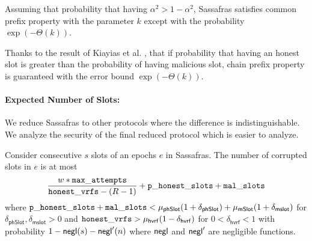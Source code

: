 \begin{lemma}[CP]
	Assuming that probability that having  $ \alpha^2 > 1- \alpha^2 $, Sassafras satisfies common prefix property  with the parameter $ k $ except with the probability  $ \exp(-\Theta(k)) $. 
\end{lemma}


Thanks to the result of  Kiayias et al. \cite{consistency}, that if probability that having an honest slot is greater than the probability of having malicious slot, chain prefix property is guaranteed with the error bound $ \exp(-\Theta(k)) $.




%
%
%
%
%
%
%
%


\paragraph{Expected Number of Slots:}


We reduce Sassafras to other protocols where the difference is indistinguishable. We analyze the security of the final reduced protocol which is easier to analyze.

\begin{theorem}
	Consider consecutive $ s $ slots of an epochs $ e $  in Sassafras. The number of corrupted slots in $ e $ is at most
	$$ \frac{w *\mathtt{max\_attempts}}{\mathtt{honest\_vrfs} - (R-1)} +  \mathtt{p\_honest\_slots} + \mathtt{mal\_slots} $$ 
	 where $ \mathtt{p\_honest\_slots} + \mathtt{mal\_slots} < \mu_{\mathsf{phSlot}}(1+\delta_{\mathsf{phSlot}}) + \mu_{\mathsf{mSlot}} (1 + \delta_{\mathsf{mslot}}) $ for  $ \delta_{\mathsf{phSlot}}, \delta_{\mathsf{mslot}} > 0 $ and $ \mathtt{honest\_vrfs} > \mu_{\mathsf{hvrf}} (1- \delta_{\mathsf{hvrf}}) $ for $ 0<\delta_{\mathsf{hvrf}} <1 $ with probability $ 1- \mathsf{negl}(s) - \mathsf{negl}'(n) $ where $ \mathsf{negl} $ and $\mathsf{negl}'  $ are  negligible functions.
\end{theorem}


